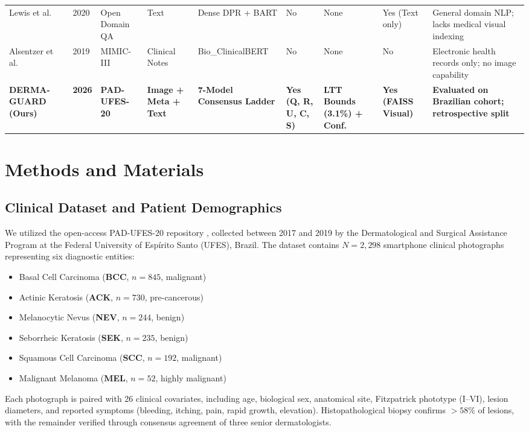 \documentclass[conference]{IEEEtran}
\begin{document}
\begin{table}[t]
\begin{tabular}{@{}lllllllll@{}}
Lewis et al.\ \cite{lewis2020retrieval} & 2020 & Open Domain QA & Text & Dense DPR + BART & No & None & Yes (Text only) & General domain NLP; lacks medical visual indexing \\
Alsentzer et al.\ \cite{alsentzer2019publicly} & 2019 & MIMIC-III & Clinical Notes & Bio\_ClinicalBERT & No & None & No & Electronic health records only; no image capability \\
\textbf{DERMA-GUARD (Ours)} & \textbf{2026} & \textbf{PAD-UFES-20} & \textbf{Image + Meta + Text} & \textbf{7-Model Consensus Ladder} & \textbf{Yes (Q, R, U, C, S)} & \textbf{LTT Bounds (3.1\%) + Conf.} & \textbf{Yes (FAISS Visual)} & \textbf{Evaluated on Brazilian cohort; retrospective split} \\
\bottomrule
\end{tabular}
\end{table}

\section{Methods and Materials}

\subsection{Clinical Dataset and Patient Demographics}
We utilized the open-access PAD-UFES-20 repository \cite{pacheco2020pad}, collected between 2017 and 2019 by the Dermatological and Surgical Assistance Program at the Federal University of Esp\'irito Santo (UFES), Brazil. The dataset contains $N=2,298$ smartphone clinical photographs representing six diagnostic entities:
\begin{itemize}
    \item Basal Cell Carcinoma (\textbf{BCC}, $n=845$, malignant)
    \item Actinic Keratosis (\textbf{ACK}, $n=730$, pre-cancerous)
    \item Melanocytic Nevus (\textbf{NEV}, $n=244$, benign)
    \item Seborrheic Keratosis (\textbf{SEK}, $n=235$, benign)
    \item Squamous Cell Carcinoma (\textbf{SCC}, $n=192$, malignant)
    \item Malignant Melanoma (\textbf{MEL}, $n=52$, highly malignant)
\end{itemize}
Each photograph is paired with 26 clinical covariates, including age, biological sex, anatomical site, Fitzpatrick phototype (I--VI), lesion diameters, and reported symptoms (bleeding, itching, pain, rapid growth, elevation). Histopathological biopsy confirms $>58\%$ of lesions, with the remainder verified through consensus agreement of three senior dermatologists.
\end{document}
